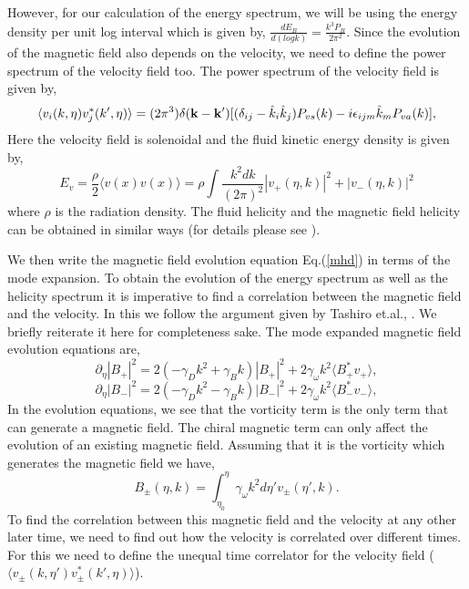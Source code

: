 \documentclass{ws-mpla}
\begin{document}
However, for our calculation of the energy spectrum, we will be using the energy density per unit log interval which is given by, 
$\frac{d E_B}{d (log k)} = \frac{k^3 P_B}{2 \pi^2}$. 
Since the evolution of the magnetic field also depends on the velocity, we need to define the power spectrum of the velocity field too. The power 
spectrum of the velocity field is given by, 
\begin{equation}
 \langle v_i(k,\eta) v_j^{*} (k',\eta) \rangle = (2 \pi^3) \delta({\bf {k - k'}}) [(\delta_{ij} - \hat k_{i} \hat k_{j}) P_{vs}(k) - i \epsilon_{ijm} \hat k_m P_{va}(k)], 
\end{equation}
Here the velocity field is solenoidal and the fluid kinetic energy density is given by, 
\begin{equation}
 E_v = \frac{\rho}{2} \langle v(x) v(x) \rangle = \rho \int {\frac{k^2 dk}{(2 \pi)^2} |v_{+}(\eta,k)|^2 + |v_{-}(\eta,k)|^2 } 
\end{equation}
where $\rho$ is the radiation density.
The fluid helicity and the magnetic field helicity can be obtained in similar ways (for details please see \cite{tashiro}).

We then write the magnetic field evolution equation Eq.(\ref{mhd}) in terms of the mode expansion. To obtain the evolution of the energy spectrum as well as 
the helicity spectrum it is imperative to find a correlation between the magnetic field and the velocity. In this we follow the argument given by Tashiro et.al., \cite{tashiro}. 
We briefly reiterate it here for completeness sake. The mode expanded magnetic field evolution equations are, 
\begin{equation}
 \partial_\eta |B_{+}|^2 = 2(-\gamma_D k^2 +\gamma_B k)|B_{+}|^2 + 2\gamma_{\omega} k^2 \langle B_{+}^{*} v_{+} \rangle,  
\end{equation}
\begin{equation}
 \partial_\eta |B_{-}|^2 = 2(-\gamma_D k^2 -\gamma_B k)|B_{-}|^2 + 2\gamma_{\omega} k^2 \langle B_{-}^{*} v_{-} \rangle,  
\end{equation}
In the evolution equations, we see that the vorticity term is the only term that can generate a magnetic field. The chiral magnetic term can only affect the evolution 
of an existing magnetic field. Assuming that it is the vorticity which generates the magnetic field we have, 
\begin{equation}
 B_{\pm} (\eta, k) = \int_{\eta_0}^{\eta} \gamma_\omega k^2 d\eta' v_{\pm}(\eta',k).
\end{equation}
To find the correlation between this magnetic field and the velocity at any other later time, we need to find out how the velocity is correlated over different times. 
For this we need to define the unequal time correlator for the velocity field ($ \langle v_{\pm}(k,\eta') v_{\pm}^{*} (k',\eta) \rangle $).
\end{document}
